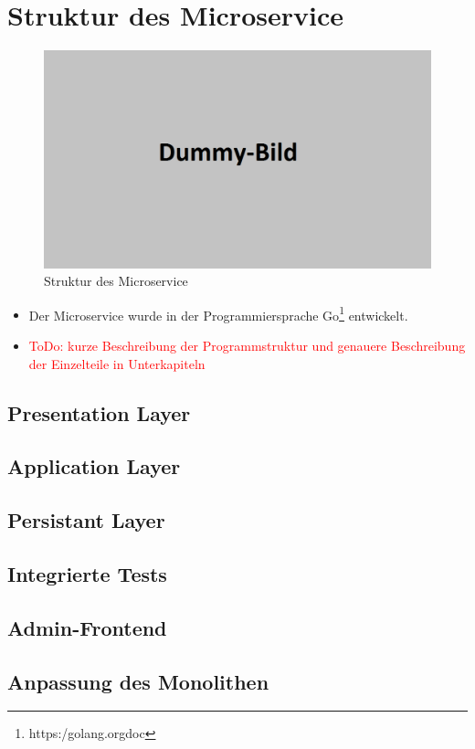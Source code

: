 \section{Struktur des Microservice}
\label{sec: Struktur des Microservice}

\begin{figure}[H]
	\begin{center}
	\includegraphics[width=0.65 \textwidth]{./Bilder/dummy.png}
	\end{center}
	\caption{Struktur des Microservice}
	\label{pic:Struktur des Microservice}
\end{figure}


\begin{itemize}
	\item Der Microservice wurde in der Programmiersprache Go\footnote{https:\//golang.org\/doc\/} entwickelt.
	\item \textcolor{red}{ToDo: kurze Beschreibung der Programmstruktur und genauere Beschreibung der Einzelteile in Unterkapiteln}
\end{itemize}

\subsection{Presentation Layer}
\label{subsec: Presentation Layer}

\subsection{Application Layer}
\label{subsec: Application Layer}

\subsection{Persistant Layer}
\label{subsec: Persistant Layer}

\subsection{Integrierte Tests}
\label{subsec: Integrierte Tests}

\subsection{Admin-Frontend}
\label{subsec: Admin-Frontend}

\subsection{Anpassung des Monolithen}
\label{subsec: Anpassung des Monolithen}